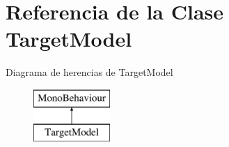 \hypertarget{class_target_model}{}\section{Referencia de la Clase Target\+Model}
\label{class_target_model}
Diagrama de herencias de Target\+Model\begin{figure}[H]
\begin{center}
\leavevmode
\includegraphics[height=2.000000cm]{class_target_model}
\end{center}
\end{figure}
